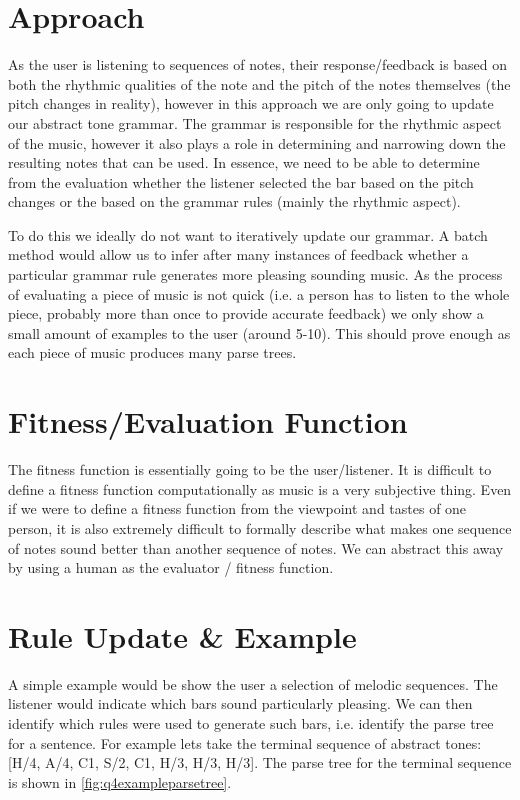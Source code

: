 \documentclass[pdftex,12pt,a4paper]{report}
\begin{document}
\section{Approach}
As the user is listening to sequences of notes, their response/feedback is based on both the rhythmic qualities of the note and the pitch of the notes themselves (the pitch changes in reality), however in this approach we are only going to update our abstract tone grammar. The grammar is responsible for the rhythmic aspect of the music, however it also plays a role in determining and narrowing down the resulting notes that can be used. In essence, we need to be able to determine from the evaluation whether the listener selected the bar based on the pitch changes or the based on the grammar rules (mainly the rhythmic aspect). 

To do this we ideally do not want to iteratively update our grammar. A batch method would allow us to infer after many instances of feedback whether a particular grammar rule generates more pleasing sounding music. As the process of evaluating a piece of music is not quick (i.e. a person has to listen to the whole piece, probably more than once to provide accurate feedback) we only show a small amount of examples to the user (around 5-10). This should prove enough as each piece of music produces many parse trees.

\section{Fitness/Evaluation Function}
The fitness function is essentially going to be the user/listener. It is difficult to define a fitness function computationally as music is a very subjective thing. Even if we were to define a fitness function from the viewpoint and tastes of one person, it is also extremely difficult to formally describe what makes one sequence of notes sound better than another sequence of notes. We can abstract this away by using a human as the evaluator / fitness function.

\section{Rule Update \& Example}

A simple example would be show the user a selection of melodic sequences. The listener would indicate which bars sound particularly pleasing. We can then identify which rules were used to generate such bars, i.e. identify the parse tree for a sentence. For example lets take the terminal sequence of abstract tones: [H/4, A/4, C1, S/2, C1, H/3, H/3, H/3]. The parse tree for the terminal sequence is shown in \ref{fig:q4exampleparsetree}.
\end{document}
